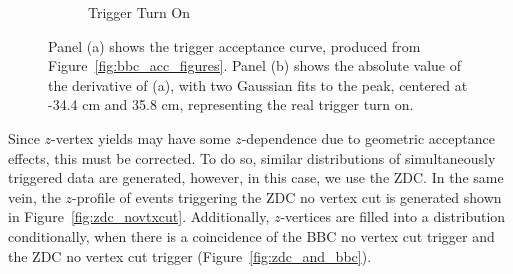 \begin{figure}
\begin{subfigure}[b]{0.7\linewidth}
    \caption{Trigger Turn On}
    \label{fig:acceptance_turn_on}
  \end{subfigure}
  \caption{
    Panel (a) shows the trigger acceptance curve, produced from
    Figure~\ref{fig:bbc_acc_figures}. Panel (b) shows the absolute
    value of the derivative of (a), with two Gaussian fits to the peak, centered
    at -34.4 cm and 35.8 cm, representing the real trigger turn on.
  }
  \label{fig:acceptance_bbc}
\end{figure}

Since $z$-vertex yields may have some $z$-dependence due to geometric acceptance
effects, this must be corrected. To do so, similar distributions of
simultaneously triggered data are generated, however, in this case, we use the
ZDC. In the same vein, the $z$-profile of events triggering the ZDC no vertex
cut is generated shown in Figure~\ref{fig:zdc_novtxcut}. Additionally,
$z$-vertices are filled into a distribution conditionally, when there is a
coincidence of the BBC no vertex cut trigger and the ZDC no vertex cut trigger
(Figure~\ref{fig:zdc_and_bbc}).

